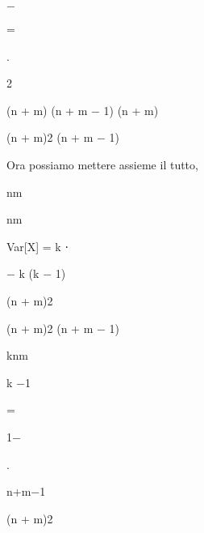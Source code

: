 \documentclass[a4paper,portrait,12pt]{article}
\begin{document}
$-$


=


.


2


\begin{flushleft}
(n + m) (n + m $-$ 1) (n + m)
\end{flushleft}


\begin{flushleft}
(n + m)2 (n + m $-$ 1)
\end{flushleft}





\begin{flushleft}
Ora possiamo mettere assieme il tutto,
\end{flushleft}


\begin{flushleft}
nm
\end{flushleft}


\begin{flushleft}
nm
\end{flushleft}


\begin{flushleft}
Var[X] = k ⋅
\end{flushleft}


\begin{flushleft}
$-$ k (k $-$ 1)
\end{flushleft}


\begin{flushleft}
(n + m)2
\end{flushleft}


\begin{flushleft}
(n + m)2 (n + m $-$ 1)
\end{flushleft}


\begin{flushleft}
knm
\end{flushleft}


\begin{flushleft}
k $-$1
\end{flushleft}


=


1$-$


.


\begin{flushleft}
n+m$-$1
\end{flushleft}


\begin{flushleft}
(n + m)2
\end{flushleft}
\end{document}
